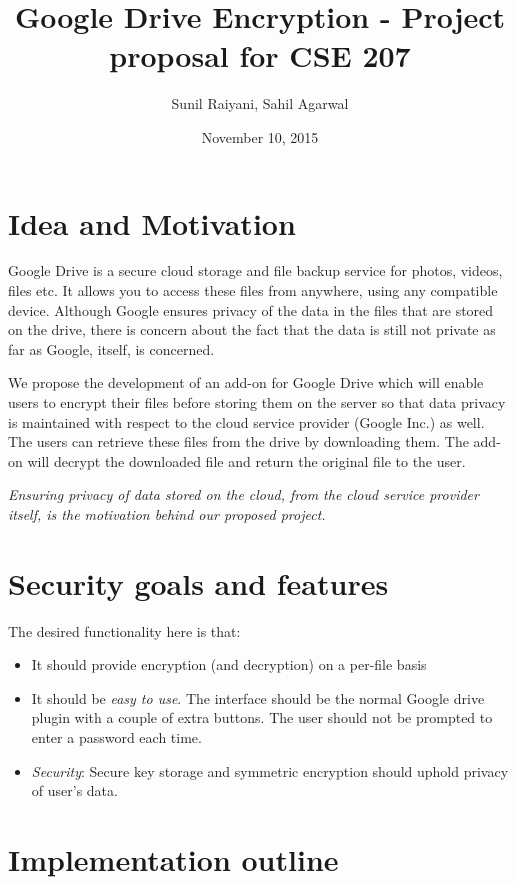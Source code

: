 \documentclass[a4paper]{article}
\title{Google Drive Encryption - Project proposal for CSE 207}
\author{Sunil Raiyani, Sahil Agarwal}
\date{November 10, 2015}
\begin{document}
\maketitle

\section{Idea and Motivation}

Google Drive is a secure cloud storage and file backup service for photos, videos, files etc. It allows you to access these files from anywhere, using any compatible device. Although Google ensures privacy of the data in the files that are stored on the drive, there is concern about the fact that the data is still not private as far as Google, itself, is concerned. 

We propose the development of an add-on for Google Drive which will enable users to encrypt their files before storing them on the server so that data privacy is maintained with respect to the cloud service provider (Google Inc.) as well. The users can retrieve these files from the drive by downloading them. The add-on will decrypt the downloaded file and return the original file to the user. 

\textit{Ensuring privacy of data stored on the cloud, from the cloud service provider itself, is the motivation behind our proposed project.} 

\section{Security goals and features}

The desired functionality here is that:
\begin{itemize}
\item It should provide encryption (and decryption) on a per-file basis
\item It should be \textit{easy to use}. The interface should be the normal Google drive plugin with a couple of extra buttons. The user should not be prompted to enter a password each time.
\item \textit{Security}: Secure key storage and symmetric encryption should uphold privacy of user's data.
\end{itemize}


\section{Implementation outline}
\end{document}
